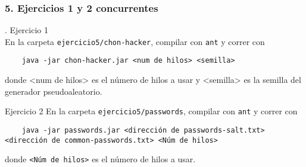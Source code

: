 \documentclass[14pt]{article}
\begin{document}
\subsubsection*{5. Ejercicios 1 y 2 concurrentes}.
\textsf{Ejercicio 1} \\
En la carpeta \texttt{ejercicio5/chon-hacker}, compilar con \texttt{ant} y correr con
\begin{verbatim}
    java -jar chon-hacker.jar <num de hilos> <semilla>
\end{verbatim}
donde <num de hilos> es el número de hilos a usar y <semilla> es la semilla del generador pseudoaleatorio.

\textsf{Ejercicio 2}
En la carpeta \texttt{ejercicio5/passwords}, compilar con \texttt{ant} y correr con
\begin{verbatim}
    java -jar passwords.jar <dirección de passwords-salt.txt> <dirección de common-passwords.txt> <Núm de hilos>
\end{verbatim}
donde \texttt{<Núm de hilos>} es el número de hilos a usar.
\end{document}
